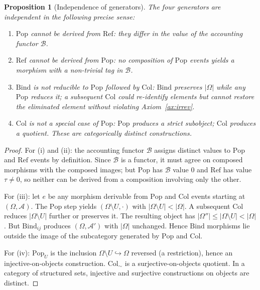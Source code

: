 \documentclass[12pt,a4paper]{article}
\newtheorem{proposition}[theorem]{Proposition}
\theoremstyle{definition}
\theoremstyle{remark}
\newcommand{\Pop}{\ensuremath{\mathrm{Pop}}}
\newcommand{\RefOp}{\ensuremath{\mathrm{Ref}}}
\newcommand{\Bind}{\ensuremath{\mathrm{Bind}}}
\newcommand{\Col}{\ensuremath{\mathrm{Col}}}
\begin{document}
\begin{proposition}[Independence of generators]
\label{prop:independence}
The four generators are independent in the following precise sense:
\begin{enumerate}[label=(\roman*)]
\item $\Pop$ cannot be derived from $\RefOp$: they differ in the value of the
  accounting functor $\mathcal{B}$.
\item $\RefOp$ cannot be derived from $\Pop$: no composition of $\Pop$ events
  yields a morphism with a non-trivial tag in $\mathcal{B}$.
\item $\Bind$ is not reducible to $\Pop$ followed by $\Col$: $\Bind$ preserves
  $|\Omega|$ while any $\Pop$ reduces it; a subsequent $\Col$ could re-identify
  elements but cannot restore the eliminated element without violating
  Axiom~\ref{ax:irrev}.
\item $\Col$ is not a special case of $\Pop$: $\Pop$ produces a strict subobject;
  $\Col$ produces a quotient. These are categorically distinct constructions.
\end{enumerate}
\end{proposition}

\begin{proof}
For (i) and (ii): the accounting functor $\mathcal{B}$ assigns distinct values to
$\Pop$ and $\RefOp$ events by definition. Since $\mathcal{B}$ is a functor, it must
agree on composed morphisms with the composed images; but $\Pop$ has $\mathcal{B}$
value $0$ and $\RefOp$ has value $\tau\ne 0$, so neither can be derived from a
composition involving only the other.

For (iii): let $e$ be any morphism derivable from $\Pop$ and $\Col$ events starting
at $(\Omega,\mathcal{A})$. The $\Pop$ step yields $(\Omega\setminus U,\cdot)$ with
$|\Omega\setminus U|<|\Omega|$. A subsequent $\Col$ reduces $|\Omega\setminus U|$
further or preserves it. The resulting object has $|\Omega''|\le|\Omega\setminus U|
<|\Omega|$. But $\Bind_{ij}$ produces $(\Omega,\mathcal{A}')$ with $|\Omega|$
unchanged. Hence $\Bind$ morphisms lie outside the image of the subcategory generated
by $\Pop$ and $\Col$.

For (iv): $\Pop_U$ is the inclusion $\Omega\setminus U\hookrightarrow\Omega$ reversed
(a restriction), hence an injective-on-objects construction. $\Col_\sim$ is a
surjective-on-objects quotient. In a category of structured sets, injective and
surjective constructions on objects are distinct.
\end{proof}
\end{document}
